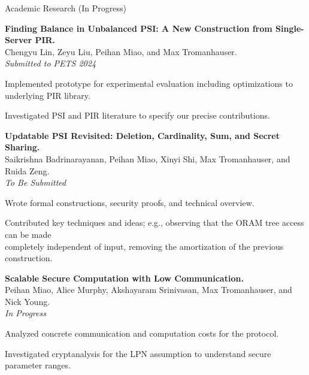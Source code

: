 \documentclass{resume} %
\begin{document}
\begin{grouping}{Academic Research \hfill (In Progress)}

    \item {\bf Finding Balance in Unbalanced PSI: A New Construction from Single-Server PIR.} \\
        Chengyu Lin, Zeyu Liu, Peihan Miao, and Max Tromanhauser. \\
        {\em Submitted to PETS 2024}
        \begin{items}
        \item Implemented prototype for experimental evaluation including optimizations to underlying PIR library.
        \item Investigated PSI and PIR literature to specify our precise contributions.
        \end{items}

    \item {\bf Updatable PSI Revisited: Deletion, Cardinality, Sum, and Secret Sharing. } \\
        Saikrishna Badrinarayanan, Peihan Miao, Xinyi Shi, Max Tromanhauser, and Ruida Zeng. \\
        {\em To Be Submitted} %
        \begin{items}
            \item Wrote formal constructions, security proofs, and technical overview.
            \item Contributed key techniques and ideas; e.g., observing that the ORAM tree
                access can be made \\ completely independent of input, removing the amortization
                of the previous construction.
        \end{items}

    \item {\bf Scalable Secure Computation with Low Communication.} \\
        Peihan Miao, Alice Murphy, Akshayaram Srinivasan, Max Tromanhauser, and Nick Young. \\
        {\em In Progress} %
        \begin{items}
        \item Analyzed concrete communication and computation costs for the protocol.
        \item Investigated cryptanalysis for the LPN assumption to understand secure parameter ranges.
            \iffalse
            \item Streamlined PCG construction by suggesting that the primal and dual random matrices can \\
                be composed.
            \fi
        \end{items}

\end{grouping}
\end{document}
